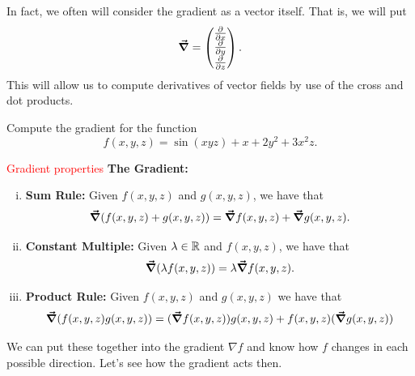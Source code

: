                         In fact, we often will consider the gradient as a vector itself.  That is, we will put
                        \[
                        \boldsymbol{\vec{\nabla}} = \begin{pmatrix} \frac{\partial}{\partial x} \\ \frac{\partial}{\partial y} \\ \frac{\partial}{\partial z} \end{pmatrix}.
                        \]
                        This will allow us to compute derivatives of vector fields by use of the cross and dot products.
                        
                        \begin{exercise}
                        Compute the gradient for the function
                        \[
                        f(x,y,z)=\sin(xyz)+x+2y^2+3x^2z.
                        \]
                        \end{exercise}

\textcolor{red}{Gradient properties}
                        \noindent\textbf{The Gradient:}
                        \begin{enumerate}[(i)]
                            \item \textbf{Sum Rule:} Given $f(x,y,z)$ and $g(x,y,z)$, we have that
                            \[
                            \boldsymbol{\vec{\nabla}}(f(x,y,z)+g(x,y,z))=\boldsymbol{\vec{\nabla}} f(x,y,z)+\boldsymbol{\vec{\nabla}} g(x,y,z).
                            \]
                            \item \textbf{Constant Multiple:} Given $\lambda \in \mathbb{R}$ and $f(x,y,z)$, we have that
                            \[
                            \boldsymbol{\vec{\nabla}}(\lambda f(x,y,z))=\lambda \boldsymbol{\vec{\nabla}} f(x,y,z).
                            \]
                            \item \textbf{Product Rule:} Given $f(x,y,z)$ and $g(x,y,z)$ we have that
                            \[
                            \boldsymbol{\vec{\nabla}}(f(x,y,z)g(x,y,z))=(\boldsymbol{\vec{\nabla}} f(x,y,z))g(x,y,z)+f(x,y,z)(\boldsymbol{\vec{\nabla}} g(x,y,z))
                            \]
                            
                        \end{enumerate}

                        We can put these together into the gradient $\nabla f$ and know how $f$ changes in each possible direction. Let's see how the gradient acts then. 
                        
